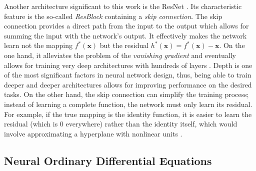 Another architecture significant to this work is the \ac{ResNet} \cite{He2015}. Its characteristic feature is the so-called \emph{\ac{ResBlock}} containing a \emph{skip connection}. The skip connection provides a direct path from the input to the output which allows for summing the input with the network's output. It effectively makes the network learn not the mapping $f^*(\pmb{x})$ but the residual $h^*(\pmb{x}) = f^*(\pmb{x}) - \pmb{x}$. On the one hand, it alleviates the problem of the \emph{vanishing gradient} \cite{Goodfellow-et-al-2016} and eventually allows for training very deep architectures with hundreds of layers \cite{He2015}. Depth is one of the most significant factors in neural network design, thus, being able to train deeper and deeper architectures allows for improving performance on the desired tasks. On the other hand, the skip connection can simplify the training process; instead of learning a complete function, the network must only learn its residual. For example, if the true mapping is the identity function, it is easier to learn the residual (which is $0$ everywhere) rather than the identity itself, which would involve approximating a hyperplane with nonlinear units \cite{He2015}.

\subsection{Neural Ordinary Differential Equations}
\label{sec:neural_odes}


